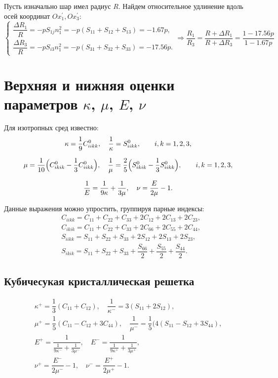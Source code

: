 \documentclass[12pt,a4paper]{article}
\begin{document}
 Пусть изначально шар имел радиус $R$. Найдем относительное удлинение вдоль осей координат $Ox_1^', Ox_3^'\colon$
 \[
    \begin{cases}
        \dfrac{\Delta R_1}{R} = -p S_{1j} n_1^2 = -p (S_{11} + S_{12} + S_{13}) = -1.67p, \\[0.7em]
        \dfrac{\Delta R_3}{R} = -p S_{i3} n_1^2 = -p (S_{31} + S_{32} + S_{33}) = -17.56p.
    \end{cases} \Rightarrow \dfrac{R_1}{R_3} = \dfrac{R + \Delta R_1}{R + \Delta R_3} = \dfrac{1 - 17.56p}{1 - 1.67p}
 \]

 \section{Верхняя и нижняя оценки параметров $\kappa$, $\mu$, $E$, $\nu$}

 Для изотропных сред известно:
 \begin{gather*}
    \kappa = \dfrac{1}{9}C^0_{iikk}, \quad \dfrac{1}{\kappa} = S^0_{iikk}, \qquad i, k = 1, 2, 3,
    \\[0.7em]
    \mu = \dfrac{1}{10}\Bigl( C^0_{ikik} - \dfrac{1}{3}C^0_{iikk} \Bigr), \quad \dfrac{1}{\mu} = \dfrac{2}{5}\Bigl( S^0_{ikik} - \dfrac{1}{3} S^0_{iikk} \Bigr), \qquad i, k = 1, 2, 3,
    \\[0.7em]
    \dfrac{1}{E} = \dfrac{1}{9 \kappa} + \dfrac{1}{3\mu}, \quad \nu = \dfrac{E}{2\mu} - 1.
 \end{gather*}

 Данные выражения можно упростить, группируя парные индексы:
 \[
    \begin{split}
        &C_{iikk} = C_{11} + C_{22} + C_{33} + 2C_{12} + 2C_{13} + 2C_{23},
        \\
        &C_{ikik} = C_{11} + C_{22} + C_{33} + 2C_{66} + 2C_{55} + 2C_{44},
        \\
        &S_{iikk} = S_{11} + S_{22} + S_{33} + 2S_{12} + 2S_{13} + 2S_{23},
        \\
        &S_{ikik} = S_{11} + S_{22} + S_{33} + \dfrac{S_{66}}{2} + \dfrac{S_{55}}{2} + \dfrac{S_{44}}{2}.
    \end{split}
 \]

 \subsection{Кубичесукая кристаллическая решетка}
 \begin{gather*}
    \kappa^+ = \dfrac{1}{3}(C_{11} + C_{12}), \quad \dfrac{1}{\kappa^-} = 3(S_{11} + 2S_{12}),
    \\[0.7em]
    \mu^+ = \dfrac{1}{5}(C_{11} - C_{12} + 3C_{44}), \quad \dfrac{1}{\mu^-} = \dfrac{1}{5}(4(S_{11} - S_{12} + 3S_{44}),
    \\[0.7em]
    E^+ = \dfrac{1}{\tfrac{1}{9 \kappa^-} + \tfrac{1}{3\mu^-}}, \quad E^- = \dfrac{1}{\tfrac{1}{9 \kappa^+} + \tfrac{1}{3\mu^+}},
    \\[0.7em]
    \nu^+ = \dfrac{E^-}{2\mu^-} - 1, \quad \nu^- = \dfrac{E^+}{2\mu^+} - 1.
 \end{gather*}
\end{document}
